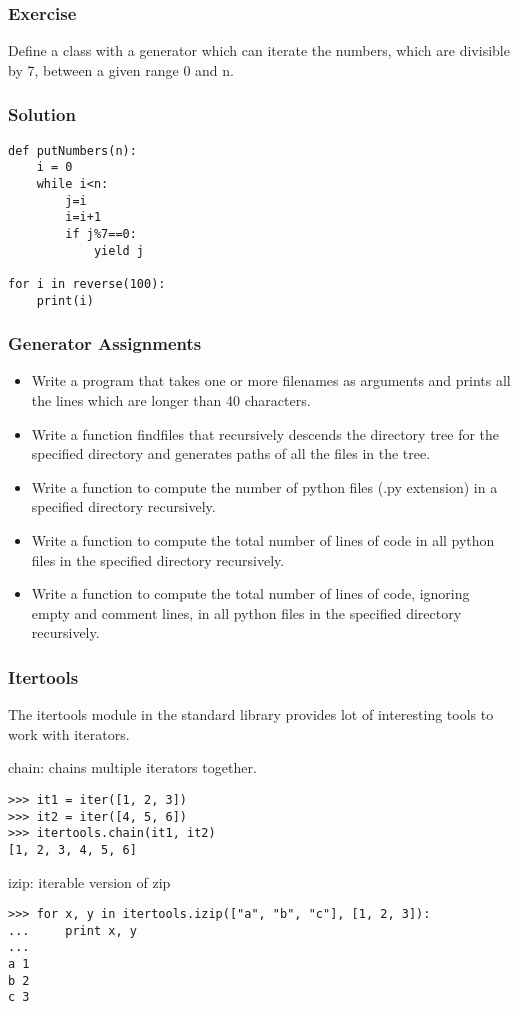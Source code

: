 \begin{frame}[fragile]\frametitle{Exercise}
Define a class with a generator which can iterate the numbers, which are divisible by 7, between a given range 0 and n.

\end{frame}

\begin{frame}[fragile]\frametitle{Solution}
\begin{lstlisting}
def putNumbers(n):
    i = 0
    while i<n:
        j=i
        i=i+1
        if j%7==0:
            yield j

for i in reverse(100):
    print(i)
\end{lstlisting}
\end{frame}


\begin{frame}[fragile]\frametitle{Generator Assignments}
    \begin{itemize}
    \item Write a program that takes one or more filenames as arguments and prints all the lines which are longer than 40 characters.
    \item  Write a function findfiles that recursively descends the directory tree for the specified directory and generates paths of all the files in the tree.
    \item Write a function to compute the number of python files (.py extension) in a specified directory recursively.
\item Write a function to compute the total number of lines of code in all python files in the specified directory recursively.
\item Write a function to compute the total number of lines of code, ignoring empty and comment lines, in all python files in the specified directory recursively.
    \end{itemize}
\end{frame}

\begin{frame}[fragile]\frametitle{Itertools}
The itertools module in the standard library provides lot of interesting tools to work with iterators.

chain: chains multiple iterators together.
\begin{lstlisting}
>>> it1 = iter([1, 2, 3])
>>> it2 = iter([4, 5, 6])
>>> itertools.chain(it1, it2)
[1, 2, 3, 4, 5, 6]
\end{lstlisting}
izip: iterable version of zip
\begin{lstlisting}
>>> for x, y in itertools.izip(["a", "b", "c"], [1, 2, 3]):
...     print x, y
...
a 1
b 2
c 3
\end{lstlisting}
\end{frame}


